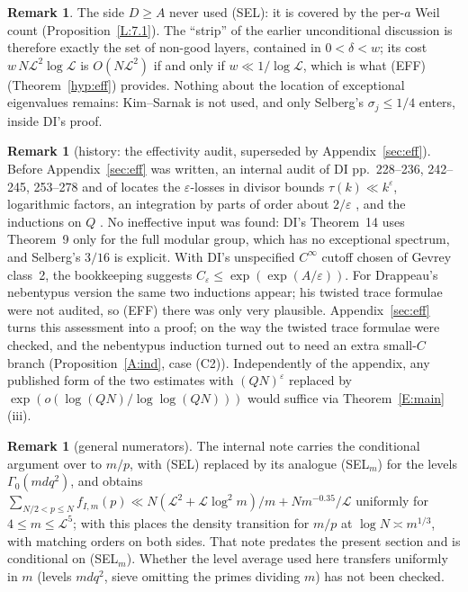 \documentclass[10pt,reqno]{amsart}
\theoremstyle{definition}
\newtheorem{remark}[theorem]{Remark}
\numberwithin{equation}{section}
\newcommand{\cL}{\mathcal L}
\begin{document}
\begin{remark}
The side $D\ge A$ never used (SEL): it is covered by the per-$a$ Weil
count (Proposition~\ref{L:7.1}). The ``strip'' of the earlier
unconditional discussion is therefore exactly the set of non-good layers,
contained in $0<\delta<w$; its cost $w\,N\cL^2\log\cL$ is $O(N\cL^2)$ if and
only if $w\ll1/\log\cL$, which is what (EFF) (Theorem~\ref{hyp:eff}) provides. Nothing about the
location of exceptional eigenvalues remains: Kim--Sarnak is not used,
and only Selberg's $\sigma_j\le1/4$ enters, inside DI's proof.
\end{remark}

\begin{remark}[history: the effectivity audit, superseded by Appendix~\ref{sec:eff}]\label{E:ass}
Before Appendix~\ref{sec:eff} was written, an internal audit of DI pp.~228--236, 242--245, 253--278 and of
\cite[\S4.2.3]{Dr} locates the $\varepsilon$-losses in divisor bounds
$\tau(k)\ll k^\varepsilon$, logarithmic factors, an integration by parts of
order about $2/\varepsilon$ \cite[(1.27), p.~257]{DI}, and the inductions on
$Q$ \cite[(8.12), (8.19)]{DI}. No ineffective input was found: DI's
Theorem~14 uses Theorem~9 only for the full modular group, which has no
exceptional spectrum, and Selberg's $3/16$ is explicit. With DI's
unspecified $C^\infty$ cutoff chosen of Gevrey class~2, the bookkeeping
suggests $C_\varepsilon\le\exp(\exp(A/\varepsilon))$. For Drappeau's nebentypus
version the same two inductions appear; his twisted trace formulae were
not audited, so (EFF) there was only very plausible. Appendix~\ref{sec:eff}
turns this assessment into a proof; on the way the twisted trace formulae
were checked, and the nebentypus induction turned out to need an extra
small-$C$ branch (Proposition~\ref{A:ind}, case (C2)). Independently of the
appendix, any published form of the two estimates with
$(QN)^\varepsilon$ replaced by $\exp(o(\log(QN)/\log\log(QN)))$ would suffice
via Theorem~\ref{E:main}(iii).
\end{remark}

\begin{remark}[general numerators]\label{E:mn4}
The internal note \cite{MN4} carries the conditional argument over to
$m/p$, with (SEL) replaced by its analogue (SEL$_m$) for the levels
$\Gamma_0(mdq^2)$, and obtains
$\sum_{N/2<p\le N}f_{I,m}(p)\ll N(\cL^2+\cL\log^2m)/m+Nm^{-0.35}/\cL$ uniformly
for $4\le m\le\cL^5$; with \cite[Theorem~U]{MN2} this places the
density transition for $m/p$ at $\log N\asymp m^{1/3}$, with matching
orders on both sides. That note predates the present section and is
conditional on (SEL$_m$). Whether the level average used here transfers
uniformly in $m$ (levels $mdq^2$, sieve omitting the primes dividing $m$)
has not been checked.
\end{remark}
\end{document}
